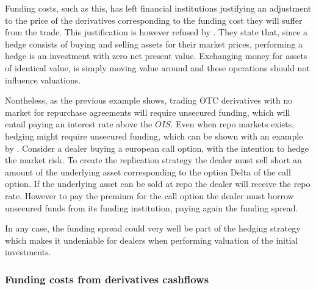 \documentclass[../main.tex]{subfiles}
\begin{document}
        Funding costs, such as this, has left financial institutions justifying an adjustment to the price of the derivatives corresponding to the funding cost they will suffer from the trade. This justification is however refused by \cite{HullWhite2012FVA}. They state that, since a hedge consists of buying and selling assets for their market prices, performing a hedge is an investment with zero net present value. Exchanging money for assets of identical value, is simply moving value around and these operations should not influence valuations. 

        Nontheless, as the previous example shows, trading OTC derivatives with no market for repurchase agreements will require unsecured funding, which will entail paying an interest rate above the $OIS$. Even when repo markets exists, hedging might require unsecured funding, which can be shown with an example by \cite{Castagna2012FVA}. Consider a dealer buying a european call option, with the intention to hedge the market risk. To create the replication strategy the dealer must sell short an amount of the underlying asset corresponding to the option Delta of the call option. If the underlying asset can be sold at repo the dealer will receive the repo rate. However to pay the premium for the call option the dealer must borrow unsecured funds from its funding institution, paying again the funding spread. 

        In any case, the funding spread could very well be part of the hedging strategy which makes it undeniable for dealers when performing valuation of the initial investments.
        
    \subsubsection{Funding costs from derivatives cashflows}
\end{document}
